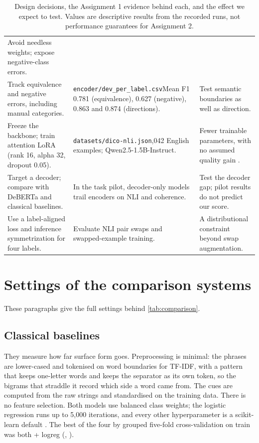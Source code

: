 \begin{table}[H]
\begin{tabular}{@{}L{0.26\textwidth}N{0.35\textwidth}L{0.29\textwidth}@{}}
Avoid needless weights; expose negative-class errors. \\
\addlinespace[5pt]
Track equivalence and negative errors, including manual categories. &
\texttt{encoder/dev\_per\_label.csv}\newline Mean F1 0.781 (equivalence), 0.627 (negative), 0.863 and 0.874 (directions). &
Test semantic boundaries as well as direction. \\
\addlinespace[5pt]
Freeze the backbone; train attention LoRA (rank 16, alpha 32, dropout 0.05). &
\texttt{datasets/dico-nli.json},042 English examples; Qwen2.5-1.5B-Instruct. &
Fewer trainable parameters, with no assumed quality gain \citep{hu-etal-2022-lora,qwen2025qwen25technicalreport}. \\
\addlinespace[5pt]
Target a decoder; compare with DeBERTa and classical baselines. &
\citet{apaolaza-larraya-etal-2026-assessing}\newline In the task pilot, decoder-only models trail encoders on NLI and coherence. &
Test the decoder gap; pilot results do not predict our score. \\
\addlinespace[5pt]
Use a label-aligned loss and inference symmetrization for four labels. &
\citet{wang-sun-xing-2019-swap}\newline Evaluate NLI pair swaps and swapped-example training. &
A distributional constraint beyond swap augmentation. \\
\bottomrule
\end{tabular}
\caption{Design decisions, the Assignment 1 evidence behind each, and the effect we expect to test. Values are descriptive results from the recorded runs, not performance guarantees for Assignment 2.}
\label{tab:method-justification}
\end{table}


\section{Settings of the comparison systems}
\label{app:comparison}

These paragraphs give the full settings behind \cref{tab:comparison}.

\subsection{Classical baselines}
They measure how far surface form goes. Preprocessing is minimal: the phrases are lower-cased and tokenised on word boundaries for TF-IDF, with a pattern that keeps one-letter words and keeps the separator as its own token, so the bigrams that straddle it record which side a word came from. The cues are computed from the raw strings and standardised on the training data. There is no feature selection. Both models use balanced class weights; the logistic regression runs up to 5{,}000 iterations, and every other hyperparameter is a scikit-learn default \citep{pedregosa-etal-2011-scikit}. The best of the four by grouped five-fold cross-validation on train was both + logreg (, ).

